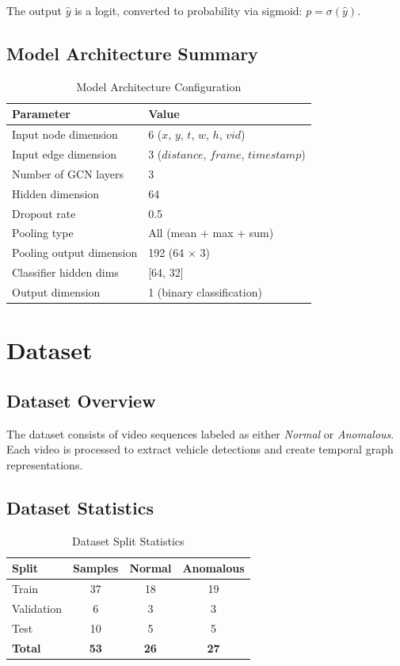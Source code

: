 \documentclass[11pt,a4paper]{article}
\begin{document}
The output $\hat{y}$ is a logit, converted to probability via sigmoid: $p = \sigma(\hat{y})$.

\subsection{Model Architecture Summary}

\begin{table}[H]
\centering
\caption{Model Architecture Configuration}
\begin{tabular}{ll}
\toprule
\textbf{Parameter} & \textbf{Value} \\
\midrule
Input node dimension & 6 ($x$, $y$, $t$, $w$, $h$, $vid$) \\
Input edge dimension & 3 ($distance$, $frame$, $timestamp$) \\
Number of GCN layers & 3 \\
Hidden dimension & 64 \\
Dropout rate & 0.5 \\
Pooling type & All (mean + max + sum) \\
Pooling output dimension & 192 (64 $\times$ 3) \\
Classifier hidden dims & [64, 32] \\
Output dimension & 1 (binary classification) \\
\bottomrule
\end{tabular}
\end{table}

\section{Dataset}

\subsection{Dataset Overview}

The dataset consists of video sequences labeled as either \textit{Normal} or \textit{Anomalous}. Each video is processed to extract vehicle detections and create temporal graph representations.

\subsection{Dataset Statistics}

\begin{table}[H]
\centering
\caption{Dataset Split Statistics}
\begin{tabular}{lccc}
\toprule
\textbf{Split} & \textbf{Samples} & \textbf{Normal} & \textbf{Anomalous} \\
\midrule
Train & 37 & 18 & 19 \\
Validation & 6 & 3 & 3 \\
Test & 10 & 5 & 5 \\
\textbf{Total} & \textbf{53} & \textbf{26} & \textbf{27} \\
\bottomrule
\end{tabular}
\end{table}
\end{document}
